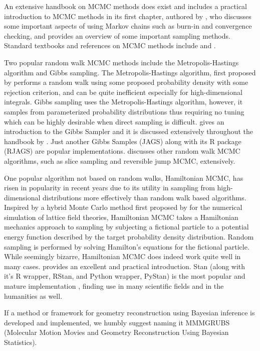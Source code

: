 An extensive handbook on MCMC methods does exist \citep{Brooks11} and includes a practical introduction to MCMC methods in its first chapter, authored by \citet{Geyer11}, who discusses some important aspects of using Markov chains such as burn-in and convergence checking, and provides an overview of some important sampling methods. Standard textbooks and references on MCMC methods include \citet{Gilks95} and \citet{Christian99}.

Two popular random walk MCMC methods include the Metropolis-Hastings algorithm and Gibbs sampling. The Metropolis-Hastings algorithm, first proposed by \citet{Metropolis53} performs a random walk using some proposed probability density with some rejection criterion, and can be quite inefficient especially for high-dimensional integrals. Gibbs sampling uses the Metropolis-Hastings algorithm, however, it samples from parameterized probability distributions thus requiring no tuning which can be highly desirable when direct sampling is difficult. \citet{Casella92} gives an introduction to the Gibbs Sampler and it is discussed extensively throughout the handbook by \citet{Brooks11}. Just another Gibbs Samples (JAGS) \citep{Plummer03} along with its R package (RJAGS) are popular implementations. \citet{Brooks11} discusses other random walk MCMC algorithms, such as slice sampling and reversible jump MCMC, extensively.

One popular algorithm not based on random walks, Hamiltonian MCMC, has risen in popularity in recent years due to its utility in sampling from high-dimensional distributions more effectively than random walk based algorithms. Inspired by a hybrid Monte Carlo method first proposed by \citet{Duane87} for the numerical simulation of lattice field theories, Hamiltonian MCMC takes a Hamiltonian mechanics approach to sampling by subjecting a fictional particle to a potential energy function described by the target probability density distribution. Random sampling is performed by solving Hamilton's equations for the fictional particle. While seemingly bizarre, Hamiltonian MCMC does indeed work quite well in many cases. \citet{Neal11} provides an excellent and practical introduction. Stan (along with it's R wrapper, RStan, and Python wrapper, PyStan) is the most popular and mature implementation \citep{Carpenter17}, finding use in many scientific fields and in the humanities as well.

If a method or framework for geometry reconstruction using Bayesian inference is developed and implemented, we humbly suggest naming it MMMGRUBS\footnotemark~ (Molecular Motion Movies and Geometry Reconstruction Using Bayesian Statistics).

